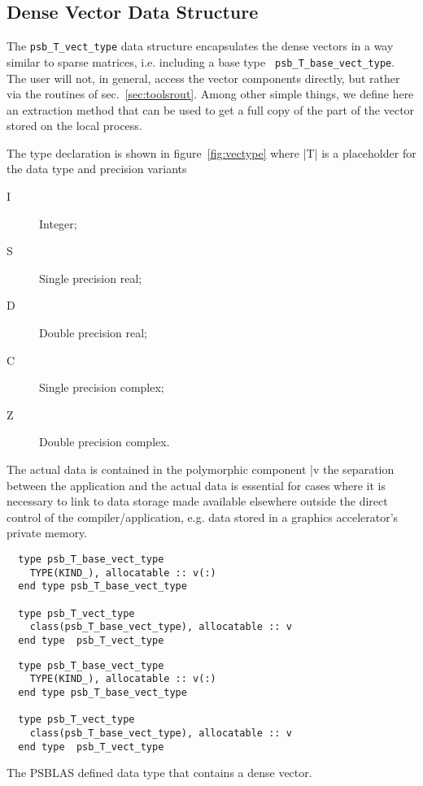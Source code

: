 \subsection{Dense Vector Data Structure}
\label{sec:vecttype}
The \hypertarget{vdata}{{\tt psb\_T\_vect\_type}} data structure
encapsulates the dense vectors in a way similar to sparse matrices,
i.e. including a base type \hypertarget{vbasedata}{{\tt
    psb\_T\_base\_vect\_type}}.  
The user will not, in general, access the vector components directly,
but rather via the routines of sec.~\ref{sec:toolsrout}. Among other
simple things, we define here an extraction method that can be used to
get a full copy of the part of the vector stored on the local
process. 

 The type declaration is shown in
figure~\ref{fig:vectype} where \fortinline|T| is a placeholder for the
data type and precision variants 
\begin{description}
\item[I] Integer;
\item[S] Single precision real;
\item[D] Double precision real;
\item[C] Single precision complex;
\item[Z] Double precision complex.
\end{description}
The actual data is contained in the polymorphic component \fortinline|v%
the separation between the application and the actual data is
essential for cases where it is necessary to link to data storage made
available elsewhere outside the direct control of the
compiler/application, e.g. data stored in a graphics  accelerator's
private memory. 
\begin{listing}[h!]
 
\ifpdf
\begin{verbatim}
  type psb_T_base_vect_type
    TYPE(KIND_), allocatable :: v(:)
  end type psb_T_base_vect_type

  type psb_T_vect_type
    class(psb_T_base_vect_type), allocatable :: v 
  end type  psb_T_vect_type
\end{verbatim}
\else
\begin{center}
    \begin{minipage}[tl]{0.85\textwidth}
\begin{verbatim}
  type psb_T_base_vect_type
    TYPE(KIND_), allocatable :: v(:)
  end type psb_T_base_vect_type

  type psb_T_vect_type
    class(psb_T_base_vect_type), allocatable :: v 
  end type  psb_T_vect_type

\end{verbatim}
    \end{minipage}
  \end{center}
\fi
  \caption{\label{fig:vectype} 
    The PSBLAS defined data type that
    contains a dense vector.} 
\end{listing}


